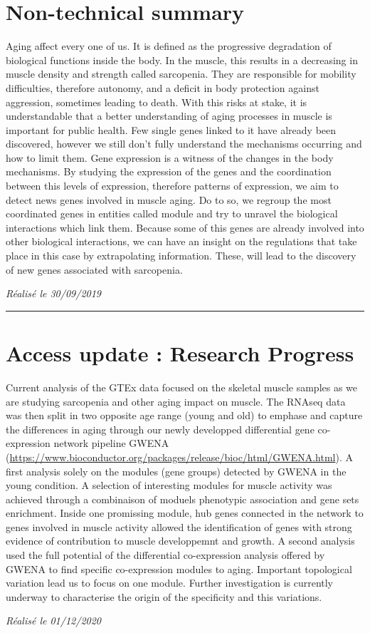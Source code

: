 \section{Non-technical summary}
Aging affect every one of us. It is defined as the progressive degradation of biological functions inside the body. In the muscle, this results in a decreasing in muscle density and strength called sarcopenia. They are responsible for mobility difficulties, therefore autonomy, and a deficit in body protection against aggression, sometimes leading to death. With this risks at stake, it is understandable that a better understanding of aging processes in muscle is important for public health. Few single genes linked to it have already been discovered, however we still don't fully understand the mechanisms occurring and how to limit them. Gene expression is a witness of the changes in the body mechanisms. By studying the expression of the genes and the coordination between this levels of expression, therefore patterns of expression, we aim to detect news genes involved in muscle aging. Do to so, we regroup the most coordinated genes in entities called module and try to unravel the biological interactions which link them. Because some of this genes are already involved into other biological interactions, we can have an insight on the regulations that take place in this case by extrapolating information. These, will lead to the discovery of new genes associated with sarcopenia.

\hfill \break
\textit{Réalisé le 30/09/2019}

\textcolor[RGB]{220,220,220}{\rule{\linewidth}{0.2pt}}

\section{Access update : Research Progress}
Current analysis of the GTEx data focused on the skeletal muscle samples as we are studying sarcopenia and other aging impact on muscle. The RNAseq data was then split in two opposite age range (young and old) to emphase and capture the differences in aging through our newly developped differential gene co-expression network pipeline GWENA (\url{https://www.bioconductor.org/packages/release/bioc/html/GWENA.html}). 
A first analysis solely on the modules (gene groups) detected by GWENA in the young condition. A selection of interesting modules for muscle activity was achieved through a combinaison of moduels phenotypic association and gene sets enrichment. Inside one promissing module, hub genes connected in the network to genes involved in muscle activity allowed the identification of genes with strong evidence of contribution to muscle developpemnt and growth.
A second analysis used the full potential of the differential co-expression analysis offered by GWENA to find specific co-expression modules to aging. Important topological variation lead us to focus on one module. Further investigation is currently underway to characterise the origin of the specificity and this variations. 

\hfill \break
\textit{Réalisé le 01/12/2020}
